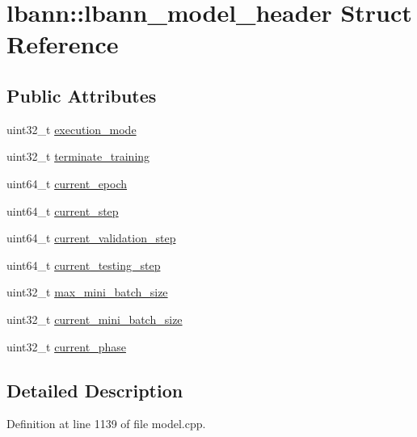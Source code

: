 \hypertarget{structlbann_1_1lbann__model__header}{}\section{lbann\+:\+:lbann\+\_\+model\+\_\+header Struct Reference}
\label{structlbann_1_1lbann__model__header}
\subsection*{Public Attributes}
\begin{DoxyCompactItemize}
\item 
uint32\+\_\+t \hyperlink{structlbann_1_1lbann__model__header_a70b35a6df7370854031470dfbd9bfc9f}{execution\+\_\+mode}
\item 
uint32\+\_\+t \hyperlink{structlbann_1_1lbann__model__header_af2f1bf6aa2757a032ae57e45f6ed1492}{terminate\+\_\+training}
\item 
uint64\+\_\+t \hyperlink{structlbann_1_1lbann__model__header_a72aeacf8c97595c1dffa7a15ed0dd050}{current\+\_\+epoch}
\item 
uint64\+\_\+t \hyperlink{structlbann_1_1lbann__model__header_ab8771bd77cc16b6653a1104ab32dcc03}{current\+\_\+step}
\item 
uint64\+\_\+t \hyperlink{structlbann_1_1lbann__model__header_abab193479ad299b6e92989cb28e2c8f7}{current\+\_\+validation\+\_\+step}
\item 
uint64\+\_\+t \hyperlink{structlbann_1_1lbann__model__header_aa5c0383d2e3992037fc622f632e56f04}{current\+\_\+testing\+\_\+step}
\item 
uint32\+\_\+t \hyperlink{structlbann_1_1lbann__model__header_a3d2c22795b490f339ff1171db43399b2}{max\+\_\+mini\+\_\+batch\+\_\+size}
\item 
uint32\+\_\+t \hyperlink{structlbann_1_1lbann__model__header_abe843d9cecf1916028026cb1f0069245}{current\+\_\+mini\+\_\+batch\+\_\+size}
\item 
uint32\+\_\+t \hyperlink{structlbann_1_1lbann__model__header_adadd68a882ba782a3899fdd6c83e2a59}{current\+\_\+phase}
\end{DoxyCompactItemize}


\subsection{Detailed Description}


Definition at line 1139 of file model.\+cpp.



